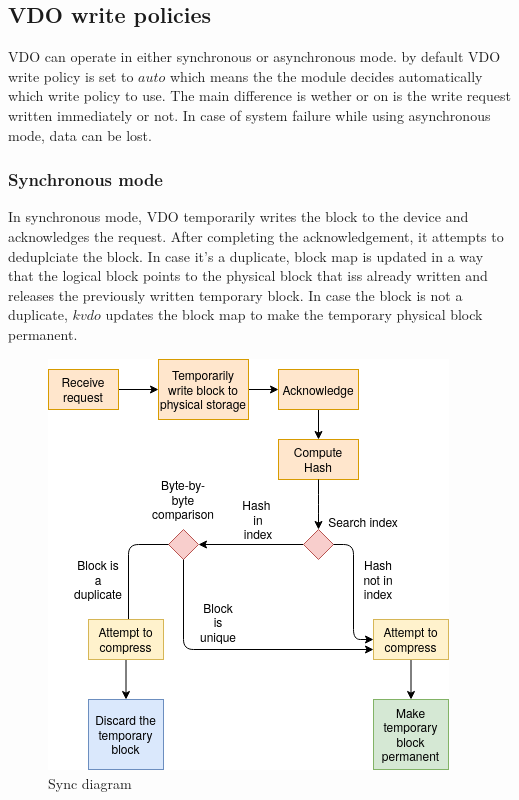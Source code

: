 \documentclass[
  color, %
  table, %
  lof,   %
  lot,   %
]{fithesis3}
\begin{document}
\subsection{VDO write policies}
VDO can operate in either synchronous or asynchronous mode.\cite{man:writemodes} by default VDO write policy is set to $auto$ which means the the module decides automatically which write policy to use. The main difference is wether or on is the write request written immediately or not. In case of system failure while using asynchronous mode, data can be lost.

\subsubsection{Synchronous mode}
In synchronous mode, VDO temporarily writes the block to the device and acknowledges the request. After completing the acknowledgement, it attempts to deduplciate the block. In case it's a duplicate, block map is updated in a way that the logical block points to the physical block that iss already written and releases the previously written temporary block. In case the block is not a duplicate, $kvdo$ updates the block map to make the temporary physical block permanent.

\begin{figure}[!htb]
        \centering
        \includegraphics[width=\textwidth]{graphics/diagrams/sync.png}
\caption[Sync]{Sync diagram}
\label{fig:sync}
\end{figure}
\end{document}
